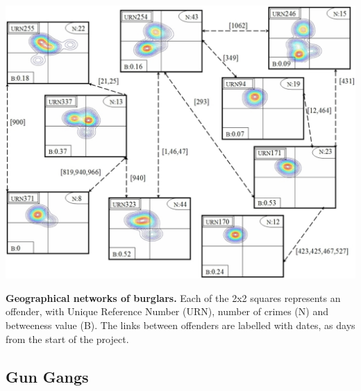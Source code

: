 \documentclass[pdftex]{beamer}
\begin{document}

\begin{frame}
\begin{center}
\includegraphics[width=0.7\paperwidth]{../images/burglary.pdf}
\end{center}
\scriptsize{{\textbf{Geographical networks of burglars.}} Each of the 2x2 squares represents an offender, with
  Unique Reference Number (URN), number of crimes (N) and betweeness
  value (B). The links between offenders are labelled with dates, as days from the start of the project.}
\end{frame}

\subsection{Gun Gangs}
\end{document}
